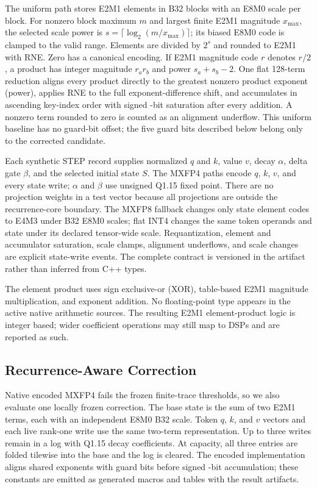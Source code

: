 \documentclass[conference]{IEEEtran}
\begin{document}
The uniform path stores E2M1 elements in B32 blocks with an E8M0 scale per
block. For nonzero block maximum $m$ and largest finite E2M1 magnitude
$x_{\max}$, the selected scale power is
$s=\lceil\log_2(m/x_{\max})\rceil$; its biased E8M0 code is clamped to the
valid range. Elements are divided by $2^s$ and rounded to E2M1 with RNE. Zero
has a canonical encoding. If E2M1 magnitude code $r$ denotes $r/2$, a product
has integer magnitude $r_a r_b$ and power $s_a+s_b-2$.
One flat 128-term reduction aligns every product directly to the greatest nonzero product exponent (power),
applies RNE to the full exponent-difference shift, and accumulates in ascending
key-index order with signed \CorrectedAccumulatorBits{}-bit saturation after
every addition. A nonzero term rounded to zero is counted as an alignment
underflow. This uniform baseline has no guard-bit offset; the five guard bits
described below belong only to the corrected candidate.

Each synthetic STEP record supplies normalized $q$ and $k$, value $v$, decay
$\alpha$, delta gate $\beta$, and the selected initial state $S$. The MXFP4
paths encode $q$, $k$, $v$, and every state write; $\alpha$ and $\beta$ use
unsigned Q1.15 fixed point. There are no projection weights in a test vector
because all projections are outside the recurrence-core boundary. The MXFP8
fallback changes only state element codes to E4M3 under B32 E8M0 scales; flat
INT4 changes the same token operands and state under its declared tensor-wide
scale. Requantization, element and accumulator saturation, scale clamps,
alignment underflows, and scale changes are explicit state-write events. The
complete contract is versioned in the artifact rather than inferred from C++
types.

The element product uses sign exclusive-or (XOR), table-based E2M1 magnitude
multiplication, and exponent addition. No floating-point type appears in the
active native arithmetic sources. The resulting E2M1 element-product logic is
integer based;
wider coefficient operations may still map to DSPs and are reported as such.

\subsection{Recurrence-Aware Correction}
Native encoded MXFP4 fails the frozen finite-trace thresholds, so we also
evaluate one locally frozen correction. The base state is the sum of two E2M1
terms, each with an independent E8M0 B32 scale. Token $q$, $k$, and $v$ vectors
and each live rank-one write use the same two-term representation. Up to three
writes remain in a log with Q1.15 decay coefficients. At capacity, all three
entries are folded tilewise into the base and the log is cleared. The encoded
implementation aligns shared exponents with \CorrectedAlignmentGuardBits{} guard bits before signed
\CorrectedAccumulatorBits{}-bit accumulation; these constants are emitted as
generated macros and tables with the result artifacts.
\end{document}
